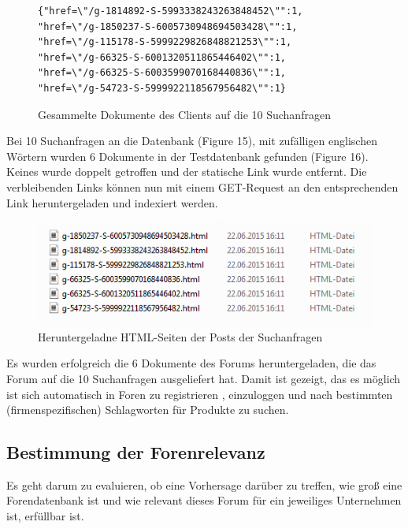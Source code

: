 \begin{figure}[h!]
\begin{lstlisting}[language=HTML5]
{"href=\"/g-1814892-S-5993338243263848452\"":1,
"href=\"/g-1850237-S-6005730948694503428\"":1,
"href=\"/g-115178-S-5999229826848821253\"":1,
"href=\"/g-66325-S-6001320511865446402\"":1,
"href=\"/g-66325-S-6003599070168440836\"":1,
"href=\"/g-54723-S-5999922118567956482\"":1}
\end{lstlisting}
\caption{Gesammelte Dokumente des Clients auf die 10 Suchanfragen}
\end{figure}

Bei 10 Suchanfragen an die Datenbank (Figure 15), mit zufälligen englischen Wörtern wurden 6 Dokumente in der Testdatenbank gefunden (Figure 16). Keines wurde doppelt getroffen und der statische Link wurde entfernt. Die verbleibenden Links können nun mit einem GET-Request an den entsprechenden Link heruntergeladen und indexiert werden.
\newpage

\begin{figure}[h!]
\includegraphics{./images/postdownload.png}
\caption{Heruntergeladne HTML-Seiten der Posts der Suchanfragen}
\end{figure}


Es wurden erfolgreich die 6 Dokumente des Forums heruntergeladen, die das Forum auf die 10 Suchanfragen ausgeliefert hat.
Damit ist gezeigt, das es möglich ist sich automatisch in Foren zu registrieren , einzuloggen und nach bestimmten (firmenspezifischen) Schlagworten für Produkte zu suchen.

\subsection{Bestimmung der Forenrelevanz}

Es geht darum zu evaluieren, ob eine Vorhersage darüber zu treffen, wie groß eine Forendatenbank ist und wie relevant dieses Forum für ein jeweiliges Unternehmen ist, erfüllbar ist.

